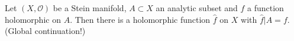 Let $(X, \mathcal{O})$ be a Stein manifold, $A \subset X$ an analytic subset and $f$ a function holomorphic on $A$. Then there is a holomorphic function $\hat{f}$ on $X$ with $\hat{f}|A = f$. (Global continuation!)
